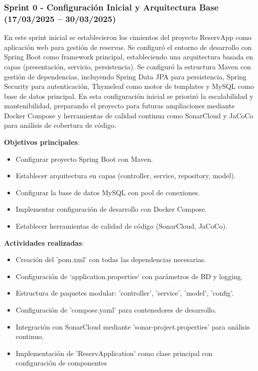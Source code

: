 \subsubsection{Sprint 0 - Configuración Inicial y Arquitectura Base (17/03/2025 – 30/03/2025)} 
En este sprint inicial se establecieron los cimientos del proyecto ReservApp como aplicación web para gestión de reservas. Se configuró el entorno de desarrollo con Spring Boot como framework principal, estableciendo una arquitectura basada en capas (presentación, servicio, persistencia). Se configuró la estructura Maven con gestión de dependencias, incluyendo Spring Data JPA para persistencia, Spring Security para autenticación, Thymeleaf como motor de templates y MySQL como base de datos principal. En esta configuración inicial se priorizó la escalabilidad y mantenibilidad, preparando el proyecto para futuras ampliaciones mediante Docker Compose y herramientas de calidad continua como SonarCloud y JaCoCo para análisis de cobertura de código.

\textbf{Objetivos principales}:
\begin{itemize}
\tightlist
\item
Configurar proyecto Spring Boot con Maven.
\item
Establecer arquitectura en capas (controller, service, repository, model).
\item
Configurar la base de datos MySQL con pool de conexiones.
\item
Implementar configuración de desarrollo con Docker Compose.
\item
Establecer herramientas de calidad de código (SonarCloud, JaCoCo).
\end{itemize}

\textbf{Actividades realizadas}:
\begin{itemize}
\tightlist
\item
Creación del 'pom.xml' con todas las dependencias necesarias.
\item
Configuración de `application.properties` con parámetros de BD y logging.
\item
Estructura de paquetes modular: 'controller', 'service', 'model', 'config'.
\item
Configuración de 'compose.yaml' para contenedores de desarrollo.
\item
Integración con SonarCloud mediante 'sonar-project.properties' para análisis continuo.
\item
Implementación de 'ReservApplication' como clase principal con configuración de componentes
\end{itemize}

